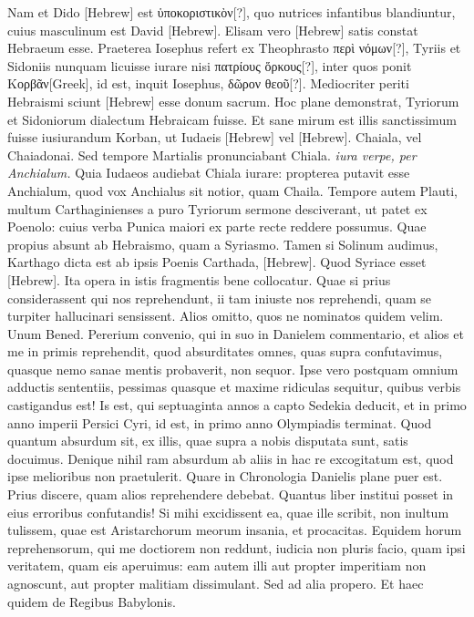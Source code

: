 Nam et Dido \texthebrew{[Hebrew]}
 est \textgreek{ὑποκοριστικὸν[?]},
 quo nutrices
infantibus blandiuntur, cuius masculinum est David \texthebrew{[Hebrew]}.
Elisam
vero \texthebrew{[Hebrew]} satis constat Hebraeum esse.
Praeterea Iosephus refert
ex Theophrasto \textgreek{περὶ νόμων[?]}, Tyriis et Sidoniis nunquam licuisse
iurare nisi \textgreek{πατρίους ὅρκους[?]},
 inter quos ponit \textgreek{Κορβᾶν[Greek]}, id est, inquit
Iosephus, \textgreek{δῶρον θεοῦ[?]}.
Mediocriter periti Hebraismi sciunt \texthebrew{[Hebrew]} esse
donum sacrum.
Hoc plane demonstrat, Tyriorum et Sidoniorum
dialectum Hebraicam fuisse.
Et sane mirum est illis sanctissimum
fuisse iusiurandum Korban, ut Iudaeis
 \texthebrew{[Hebrew]} vel \texthebrew{[Hebrew]}.
Chaiala,
vel Chaiadonai.
Sed tempore Martialis pronunciabant Chiala.
\textit{iura verpe, per Anchialum.}
Quia Iudaeos audiebat Chiala iurare:
propterea putavit esse Anchialum, quod vox Anchialus sit notior,
quam Chaila.
Tempore autem Plauti, multum Carthaginienses
a puro Tyriorum sermone desciverant, ut patet ex Poenolo:
cuius verba Punica maiori ex parte recte reddere possumus.
Quae propius absunt ab Hebraismo, quam a Syriasmo.
Tamen
si Solinum audimus, Karthago dicta est ab ipsis Poenis Carthada,
\texthebrew{[Hebrew]}.
Quod Syriace esset \texthebrew{[Hebrew]}.
Ita opera in istis fragmentis
bene collocatur.
Quae si prius considerassent qui nos reprehendunt,
ii tam iniuste nos reprehendi, quam se turpiter hallucinari
sensissent.
Alios omitto, quos ne nominatos quidem velim.
Unum Bened.
Pererium convenio, qui in suo in Danielem commentario,
et alios et me in primis reprehendit, quod absurditates
omnes, quas supra confutavimus, quasque nemo sanae mentis
probaverit, non sequor.
Ipse vero postquam omnium adductis sententiis,
pessimas quasque et maxime ridiculas sequitur, quibus verbis
castigandus est!
Is est, qui septuaginta annos a capto Sedekia
deducit, et in primo anno imperii Persici Cyri, id est, in primo
anno Olympiadis  terminat.
Quod quantum absurdum sit, ex
illis, quae supra a nobis disputata sunt, satis docuimus.
Denique
nihil ram absurdum ab aliis in hac re excogitatum est, quod ipse
melioribus non praetulerit.
Quare in Chronologia Danielis plane
puer est.
Prius discere, quam alios reprehendere debebat.
Quantus liber institui posset in eius erroribus confutandis!
Si mihi excidissent
ea, quae ille scribit, non inultum tulissem, quae est Aristarchorum
meorum insania, et procacitas.
Equidem horum reprehensorum,
qui me doctiorem non reddunt, iudicia non pluris
facio, quam ipsi veritatem, quam eis aperuimus: eam autem illi aut
propter imperitiam non agnoscunt, aut propter malitiam dissimulant.
Sed ad alia propero.
Et haec quidem de Regibus Babylonis.

